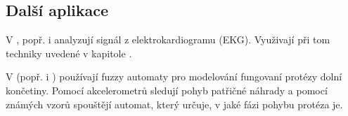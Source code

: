 \documentclass[a4paper,10pt]{article}
\begin{document}
\subsection{Další aplikace}
V \cite{PedGac-LeaFuzzAut}, popř. i \cite{RigTza-FuzAutFauDia} analyzují signál z elektrokardiogramu (EKG). Využivají při tom techniky uvedené v kapitole .

V \cite{Alv-HumGaiModUsGenFuzFinStaMac} (popř. i \cite{AlvTri-ComModQuaPerSig} )
používají fuzzy automaty pro modelování fungovaní protézy dolní končetiny. Pomocí akcelerometrů sledují pohyb patřičné náhrady a pomocí známých vzorů spouštějí automat, který určuje, v jaké fázi pohybu protéza je.

% 

% 


\end{document}
